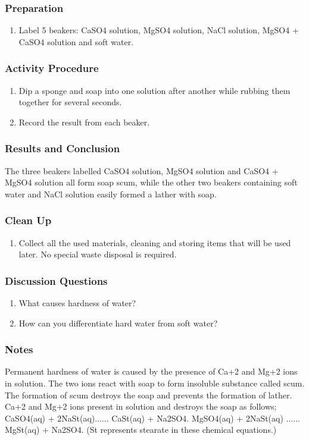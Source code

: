 \subsubsection*{Preparation}
\begin{enumerate}
\item{Label 5 beakers: CaSO4 solution, MgSO4 solution, NaCl solution, MgSO4 + CaSO4 solution and soft water.}
\end{enumerate}

\subsubsection*{Activity Procedure}
\begin{enumerate}
\item{Dip a sponge and soap into one solution after another while rubbing them together for several seconds.}
\item{Record the result from each beaker.}
\end{enumerate}

\subsubsection*{Results and Conclusion}
The three beakers labelled CaSO4 solution, MgSO4 solution and CaSO4 + MgSO4 solution all form soap scum, while the other two beakers containing soft water and NaCl solution easily formed a lather with soap.

\subsubsection*{Clean Up}
\begin{enumerate}
\item{Collect all the used materials, cleaning and storing items that will be used later. No special waste disposal is required.}
\end{enumerate}

\subsubsection*{Discussion Questions}
\begin{enumerate}
\item{What causes hardness of water?}
\item{How can you differentiate hard water from soft water?}
\end{enumerate}

\subsubsection*{Notes}
Permanent hardness of water is caused by the presence of Ca+2 and Mg+2 ions in solution. The two ions react with soap to form insoluble substance called scum. The formation of scum destroys the soap and prevents the formation of lather. Ca+2 and Mg+2 ions present in solution and destroys the soap as follows;
CaSO4(aq) + 2NaSt(aq)...... CaSt(aq) + Na2SO4.
MgSO4(aq) + 2NaSt(aq) ...... MgSt(aq) + Na2SO4.
(St represents stearate in these chemical equations.)

